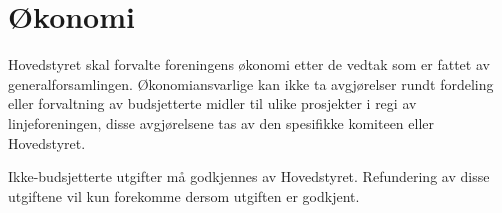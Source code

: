 \chapter{Økonomi}
\label{chap:okonomi}
Hovedstyret skal forvalte foreningens økonomi etter de vedtak som er fattet av generalforsamlingen. 
Økonomiansvarlige kan ikke ta avgjørelser rundt fordeling eller forvaltning av budsjetterte midler til ulike prosjekter i regi av linjeforeningen, disse avgjørelsene tas av den spesifikke komiteen eller Hovedstyret. \newline

Ikke-budsjetterte utgifter må godkjennes av Hovedstyret. Refundering av disse utgiftene vil kun forekomme dersom utgiften er godkjent.

